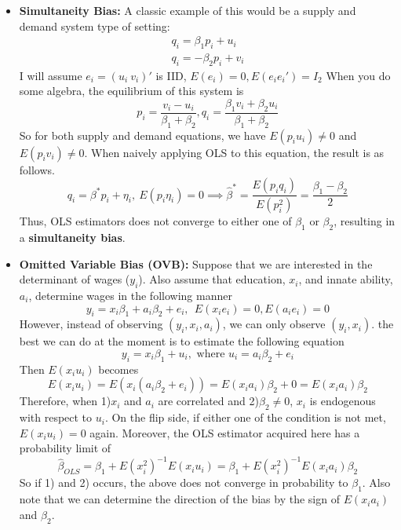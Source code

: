 \documentclass[12pt]{article}
\theoremstyle{definition}
\theoremstyle{property}
\theoremstyle{assumption}
\theoremstyle{example}
\theoremstyle{comment}
\newtheorem{comment}{Comment}[section]
\begin{document}
\begin{itemize}
\begin{mdframed}[backgroundcolor=yellow!5]
\begin{comment}[Comment on Measurement Errors]
\item If there is a measurement error in $y_i$, the only this it does is to change the component of $e_i$. Assuming all the old assumptions hold, this does not pose as much problem as having a measurement error in the regressor. 
\end{itemize}
\end{comment}
\end{mdframed}
\item \textbf{Simultaneity Bias: } A classic example of this would be a supply and demand system type of setting:
\begin{gather*}
q_i = \beta_1p_i+u_i \tag{Supply}\\
q_i = -\beta_2p_i+v_i \tag{Demand}
\end{gather*}
I will assume $e_i = (u_i \ v_i)'$ is IID, $E(e_i)=0, E(e_ie_i')=I_{2}$
When you do some algebra, the equilibrium of this system is 
\[
p_i = \frac{v_i-u_i}{\beta_1+\beta_2}, q_i = \frac{\beta_1v_i + \beta_2u_i}{\beta_1+\beta_2}
\]
So for both supply and demand equations, we have $E(p_iu_i)\neq0$ and $E(p_iv_i)\neq0$. When naively applying OLS to this equation, the result is as follows. 
\[
q_i=\beta^*p_i+\eta_i, \ E(p_i\eta_i)=0 \implies \hat{\beta}^*=\frac{E(p_iq_i)}{E(p_i^2)}=\frac{\beta_1-\beta_2}{2}
\]
Thus, OLS estimators does not converge to either one of $\beta_1$ or $\beta_2$, resulting in a \textbf{simultaneity bias}.  
\item \textbf{Omitted Variable Bias (OVB): } Suppose that we are interested in the determinant of wages ($y_i$). Also assume that education, $x_i$, and innate ability,  $a_i$, determine wages in the following manner
\[
y_ i = x_i\beta_1+a_i\beta_2+e_i, \ \ E(x_ie_i)=0, E(a_ie_i)=0
\]
However, instead of observing $(y_i,x_i,a_i)$, we can only observe $(y_i, x_i)$. the best we can do at the moment is to estimate the following equation
\[
y_i=x_i\beta_1+u_i,\text{ where } u_i=a_i\beta_2 + e_i
\] 
Then $E(x_iu_i)$ becomes
\[
E(x_iu_i)= E(x_i(a_i\beta_2+e_i))=E(x_ia_i)\beta_2+0 = E(x_ia_i)\beta_2
\]
Therefore, when 1)$x_i$ and $a_i$ are correlated and 2)$\beta_2\neq0$, $x_i$ is endogenous with respect to $u_i$. On the flip side, if either one of the condition is not met, $E(x_iu_i)=0$ again. Moreover, the OLS estimator acquired here has a probability limit of
\[
\hat{\beta}_{OLS}=\beta_1+E(x_i^2)^{-1}E(x_iu_i)=\beta_1+E(x_i^2)^{-1}E(x_ia_i)\beta_2
\]
So if 1) and 2) occurs, the above does not converge in probability to $\beta_1$. Also note that we can determine the direction of the bias by the sign of $E(x_ia_i)$ and $\beta_2$. 
\end{itemize}
\end{document}
